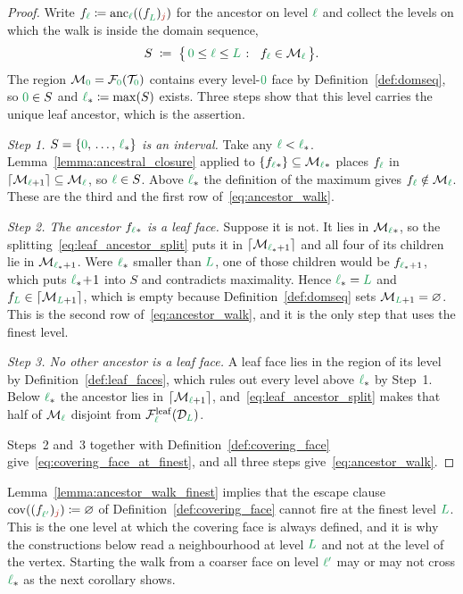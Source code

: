 \documentclass[a4paper, 12pt]{article}
\makeatletter
\newcommand{\lstar}{\l_{\ast}}
\newcommand{\green}{\color{ForestGreen}}
\newcommand{\brickred}{\color{BrickRed}}
\newcommand{\T}{\mathcal{T}}
\newcommand{\F}{\mathcal{F}}
\newcommand{\face}[2]{\freeQ{f}{}{#1}{#2}}
\newcommand{\fineIdxone}{{\brickred j}}
\renewcommand{\l}{{\green\ell}}
\renewcommand{\L}{{\green L}}
\newcommand{\lzero}{{\green 0}}
\newcommand{\lone}{{\green {\l'}  }}
\newcommand{\freeQ}[4]{ ( {#1}^{#2}_{#3} )_{#4}}
\newcommand{\M}{\mathcal{M}}
\theoremstyle{definition}
\theoremstyle{plain}
\numberwithin{equation}{section}
\newcommand{\ancestorPatch}[1]{\lceil #1 \rceil}
\DeclareRobustCommand{\domseq}[1][]{\mathcal{D}\ifx\@empty#1\@empty\else_{#1}\fi}
\newcommand{\leafF}[1]{\F^{\mathrm{leaf}}_{#1}}             %
\newcommand{\anc}[1]{\mathrm{anc}_{#1}}                     %
\newcommand{\coveringFace}{\mathrm{cov}}                    %
\makeatother
\begin{document}
\begin{proof}
    Write $f_\l \coloneq \anc{\l}(\face{\L}{\fineIdxone})$ for the ancestor on level $\l$ and collect the levels on which the walk is inside the domain sequence,
    \begin{equation*}
        S \; \coloneq \; \big\{ \, \lzero \leq \l \leq \L \; \colon \;\; f_\l \in \M_\l \, \big\} .
    \end{equation*}
    The region $\M_\lzero = \F_\lzero(\T_\lzero)$ contains every level-$\lzero$ face by Definition~\ref{def:domseq}, so $\lzero \in S$ and $\lstar \coloneq \max (S)$ exists. Three steps show that this level carries the unique leaf ancestor, which is the assertion.

    \emph{Step 1. $S = \{ \lzero, \, \dots, \, \lstar \}$ is an interval.} Take any $\l < \lstar$. Lemma~\ref{lemma:ancestral_closure} applied to $\{ f_\lstar \} \subseteq \M_\lstar$ places $f_\l$ in $\ancestorPatch{\M_{\l+1}} \subseteq \M_\l$, so $\l \in S$. Above $\lstar$ the definition of the maximum gives $f_\l \notin \M_\l$. These are the third and the first row of~\eqref{eq:ancestor_walk}.

    \emph{Step 2. The ancestor $f_\lstar$ is a leaf face.} Suppose it is not. It lies in $\M_\lstar$, so the splitting~\eqref{eq:leaf_ancestor_split} puts it in $\ancestorPatch{\M_{\lstar+1}}$ and all four of its children lie in $\M_{\lstar+1}$. Were $\lstar$ smaller than $\L$, one of those children would be $f_{\lstar+1}$, which puts $\lstar \! + \! 1$ into $S$ and contradicts maximality. Hence $\lstar = \L$ and $f_\L \in \ancestorPatch{\M_{\L+1}}$, which is empty because Definition~\ref{def:domseq} sets $\M_{\L+1} = \varnothing$. This is the second row of~\eqref{eq:ancestor_walk}, and it is the only step that uses the finest level.

    \emph{Step 3. No other ancestor is a leaf face.} A leaf face lies in the region of its level by Definition~\ref{def:leaf_faces}, which rules out every level above $\lstar$ by Step~1. Below $\lstar$ the ancestor lies in $\ancestorPatch{\M_{\l+1}}$, and~\eqref{eq:leaf_ancestor_split} makes that half of $\M_\l$ disjoint from $\leafF{\l}(\domseq[\L])$.

    Steps~2 and~3 together with Definition~\ref{def:covering_face} give~\eqref{eq:covering_face_at_finest}, and all three steps give~\eqref{eq:ancestor_walk}.
\end{proof}

Lemma~\ref{lemma:ancestor_walk_finest} implies that the escape clause $\coveringFace(\face{\lone}{\fineIdxone}) \coloneq \varnothing$ of Definition~\ref{def:covering_face} cannot fire at the finest level $\L$. This is the one level at which the covering face is always defined, and it is why the constructions below read a neighbourhood at level $\L$ and not at the level of the vertex. Starting the walk from a coarser face on level $\lone$ may or may not cross $\lstar$ as the next corollary shows.
\end{document}
